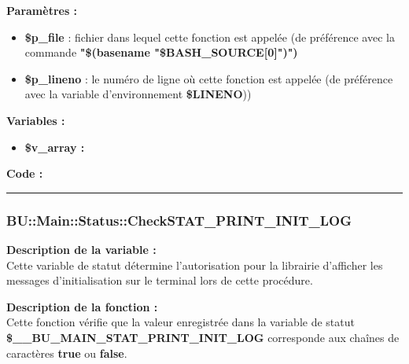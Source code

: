 \documentclass[a4paper,10pt]{article}
\begin{document}
\begin{justify}
    \textbf{Paramètres :}

    \begin{itemize}
        \item \color{orange}\textbf{\$p\_file}\color{white} : fichier dans lequel cette fonction est appelée (de préférence avec la commande \textbf{"\$(\color{gray}basename \color{white}"\color{orange}\$BASH\_SOURCE[0]\color{white}")")}\\

        \item \color{orange}\textbf{\$p\_lineno}\color{white} : le numéro de ligne où cette fonction est appelée (de préférence avec la variable d'environnement \textbf{\color{orange}\$LINENO}))
    \end{itemize}
\end{justify}


\begin{justify}
    \textbf{Variables :}

    \begin{itemize}
        \item \textbf{\color{orange}\$v\_array\color{white} :}
    \end{itemize}
\end{justify}

\begin{justify}
    \textbf{Code :}
\end{justify}



\color{blue}\par\noindent\rule{\textwidth}{0.4pt}\color{white}

\color{blue}
\subsubsection{\color{mauve}BU::Main::Status::CheckSTAT\_PRINT\_INIT\_LOG}\color{white}

\begin{justify}
    \textbf{Description de la variable :}\\
    Cette variable de statut détermine l'autorisation pour la librairie d'afficher les messages d'initialisation sur le terminal lors de cette procédure.
\end{justify}

\begin{justify}
    \textbf{Description de la fonction :}\\
    Cette fonction vérifie que la valeur enregistrée dans la variable de statut\\ \textbf{\color{orange}\$\_\_BU\_MAIN\_STAT\_PRINT\_INIT\_LOG} corresponde aux chaînes de caractères \textbf{true} ou \textbf{false}.
\end{justify}
\end{document}
